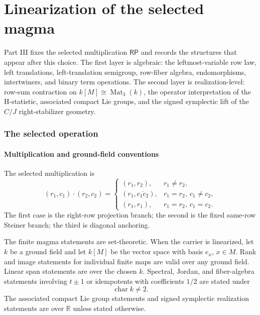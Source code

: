 \documentclass[11pt]{article}
\theoremstyle{definition}
\newcommand{\RP}{\mathsf{RP}}
\begin{document}
\clearpage

\part{Linearization of the selected magma}

Part III fixes the selected multiplication \(\RP\) and records the structures
that appear after this choice.  The first layer is algebraic: the leftmost-variable row law,
left translations, left-translation semigroup, row-fiber algebra, endomorphisms,
intertwiners, and binary term operations.  The second layer is realization-level:
row-sum contraction on \(k[M]\cong\operatorname{Mat}_3(k)\), the
operator interpretation of the H-statistic, associated compact Lie groups, and the signed
symplectic lift of the \(C/J\) right-stabilizer geometry.

\section{The selected operation}\label{selected-operation}\label{the-selected-rp-operation}

\subsection{Multiplication and ground-field conventions}\label{selected-multiplication-ground-fields}\label{rp-multiplication-and-ground-fields}

The selected multiplication is
\[
(r_1,c_1)\cdot(r_2,c_2)=
\begin{cases}
(r_1,r_2), & r_1\ne r_2,\\[2mm]
(r_1,\overline{c_1c_2}), & r_1=r_2,\ c_1\ne c_2,\\[2mm]
(r_1,r_1), & r_1=r_2,\ c_1=c_2.
\end{cases}
\]
The first case is the right-row projection branch; the second is the fixed
same-row Steiner branch; the third is diagonal anchoring.

The finite magma statements are set-theoretic.  When the carrier is
linearized, let \(k\) be a ground field and let \(k[M]\) be the vector space
with basis \(e_x\), \(x\in M\).  Rank and image statements for individual
finite maps are valid over any ground field.  Linear span statements are over
the chosen \(k\).  Spectral, Jordan, and fiber-algebra statements involving
\(t\pm1\) or idempotents with coefficients \(1/2\) are stated under
\[
\operatorname{char}k\ne2.
\]
The associated compact Lie group statements and signed symplectic realization statements
are over \(\mathbb R\) unless stated otherwise.
\end{document}
